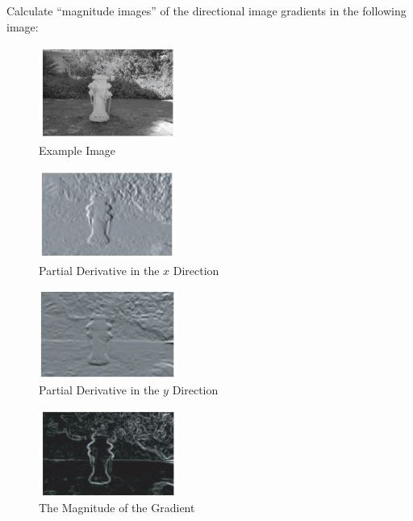 \documentclass[a4paper,11pt]{article}
\begin{document}
\begin{tcolorbox}[colback=gray!10, colframe=black, title=\textbf{Magnitude Images using First Order Derivatives}]
    Calculate ``magnitude images'' of the directional image gradients in the following image:
\begin{figure}[H]
    \centering
    \includegraphics[width=0.4\textwidth]{images/magnitudeimagesone.png}
    \caption{Example Image}
\end{figure}

\begin{multicols}{2}

\begin{figure}[H]
    \centering
    \includegraphics[width=0.4\textwidth]{images/magnitudeimagestwo.png}
    \caption{Partial Derivative in the $x$ Direction}
\end{figure}

\begin{figure}[H]
    \centering
    \includegraphics[width=0.4\textwidth]{images/magnitudeimagesthree.png}
    \caption{Partial Derivative in the $y$ Direction}
\end{figure}

\begin{figure}[H]
    \centering
    \includegraphics[width=0.4\textwidth]{images/magnitudeimagesfour.png}
    \caption{The Magnitude of the Gradient}
\end{figure}


\end{multicols}
\end{tcolorbox}
\end{document}
